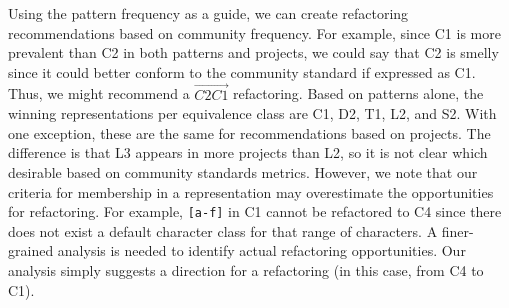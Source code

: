 Using the pattern frequency as a guide, we can create refactoring recommendations based on community frequency. For example, since C1 is more prevalent than C2 in both patterns and projects, we could say that C2 is smelly since it could better conform to the community standard if expressed as C1. Thus, we might recommend a $\overrightarrow{C2C1}$ refactoring. Based on patterns alone, the winning representations per equivalence class are C1, D2, T1, L2, and S2. With one exception, these are the same for recommendations based on projects. The difference is that L3 appears in more projects than L2, so it is not clear which desirable based on community standards metrics.
However, we note that our criteria for membership in a representation may overestimate the opportunities for refactoring. For example, \verb![a-f]! in C1 cannot be refactored to C4 since there does not exist a default character class for that range of characters. A finer-grained analysis is needed to identify actual refactoring opportunities. Our analysis simply suggests a direction for a refactoring (in this case, from C4 to C1). 

